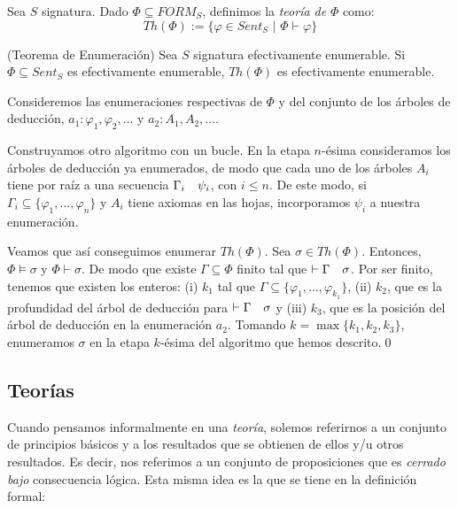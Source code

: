 \begin{definition}
Sea $S$ signatura. Dado $\Phi \subseteq FORM_S$, definimos la \textit{teoría de} $\Phi$ como:
$$Th(\Phi) := \{\varphi \in Sent_S \, \, | \, \, \Phi \vdash \varphi\}$$
\end{definition}

\begin{theorem*}(Teorema de Enumeración)
Sea $S$ signatura efectivamente enumerable. Si $\Phi \subseteq Sent_S$ es efectivamente enumerable, $Th(\Phi)$ es efectivamente enumerable.
\end{theorem*}


\begin{sketchproof}
Consideremos las enumeraciones respectivas de $\Phi$ y del conjunto de los árboles de deducción, $a_1: \varphi_1, \varphi_2, \dots$ y $a_2:A_1, A_2, \dots$.

Construyamos otro algoritmo con un bucle. En la etapa $n$-ésima consideramos los árboles de deducción ya enumerados, de modo que cada uno de los árboles $A_i$ tiene por raíz a una secuencia $\Gamma_i \quad \psi_i$, con $i \leq n$. De este modo, si $\Gamma_i \subseteq \{\varphi_1, \dots, \varphi_n\}$ y $A_i$ tiene axiomas en las hojas, incorporamos $\psi_i$ a nuestra enumeración.

Veamos que así conseguimos enumerar $Th(\Phi)$. Sea $\sigma \in Th(\Phi)$. Entonces, $\Phi \vDash \sigma$ y $\Phi \vdash \sigma$. De modo que existe $\Gamma \subseteq \Phi$ finito tal que $\vdash \Gamma \quad \sigma$. Por ser finito, tenemos que existen los enteros: (i) $k_1$ tal que $\Gamma \subseteq \{\varphi_1, \dots, \varphi_{k_1}\}$, (ii) $k_2$, que es la profundidad del árbol de deducción para $\vdash \Gamma \quad \sigma$ y (iii) $k_3$, que es la posición del árbol de deducción en la enumeración $a_2$.
Tomando $k = \max\{k_1, k_2, k_3\}$, enumeramos $\sigma$ en la etapa $k$-ésima del algoritmo que hemos descrito.\qed
\end{sketchproof}

\subsection{Teorías}

Cuando pensamos informalmente en una \textit{teoría}, solemos referirnos a un conjunto de principios básicos y a los resultados que se obtienen de ellos y/u otros resultados. Es decir, nos referimos a un conjunto de proposiciones que es \textit{cerrado bajo} consecuencia lógica. Esta misma idea es la que se tiene en la definición formal:

